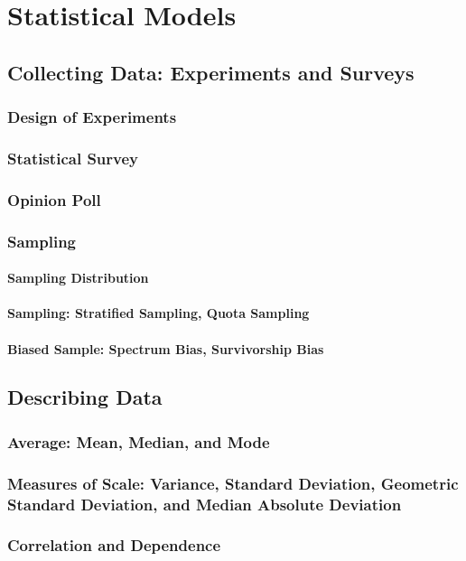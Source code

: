 \documentclass{memoir}
\begin{document}
\newpage
\part{Statistical Models}
\chapter{Collecting Data: Experiments and Surveys}
\section{Design of Experiments}
\section{Statistical Survey}
\section{Opinion Poll}

\section{Sampling}
\subsection{Sampling Distribution}
\subsection{Sampling: Stratified Sampling, Quota Sampling}
\subsection{Biased Sample: Spectrum Bias, Survivorship Bias}

\chapter{Describing Data}
\section{Average: Mean, Median, and Mode}
\section{Measures of Scale: Variance, Standard Deviation, Geometric Standard Deviation, and Median Absolute Deviation}
\section{Correlation and Dependence}
\end{document}
